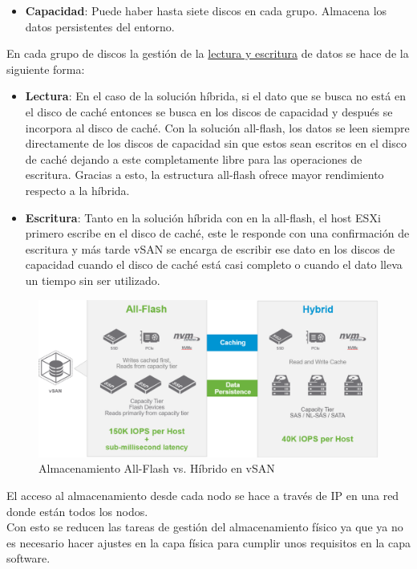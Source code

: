 \begin{itemize}
\begin{itemize}
            \item \textbf{Capacidad}: Puede haber hasta siete discos en cada grupo. Almacena los datos persistentes del entorno.
        \end{itemize}
    En cada grupo de discos la gestión de la \underline{lectura y escritura} de datos se hace de la siguiente forma:
        \begin{itemize}
            \item \textbf{Lectura}: En el caso de la solución híbrida, si el dato que se busca no está en el disco de caché entonces se busca en los discos de capacidad y después se incorpora al disco de caché. Con la solución all-flash, los datos se leen siempre directamente de los discos de capacidad sin que estos sean escritos en el disco de caché dejando a este completamente libre para las operaciones de escritura. Gracias a esto, la estructura all-flash ofrece mayor rendimiento respecto a la híbrida.
            \item \textbf{Escritura}: Tanto en la solución híbrida con en la all-flash, el host ESXi primero escribe en el disco de caché, este le responde con una confirmación de escritura y más tarde vSAN se encarga de escribir ese dato en los discos de capacidad cuando el disco de caché está casi completo o cuando el dato lleva un tiempo sin ser utilizado.
        \end{itemize}
        \begin{figure}[h!]
            \centering
            \includegraphics[width=1\textwidth]{imaxes/cap2recursos/rendimientoVSAN.png}
            \caption{Almacenamiento All-Flash vs. Híbrido en vSAN}
            \label{fig:rendimientoVSAN}
        \end{figure}
        \FloatBarrier
    El acceso al almacenamiento desde cada nodo se hace a través de IP en una red donde están todos los nodos. \\ 
    Con esto se reducen las tareas de gestión del almacenamiento físico ya que ya no es necesario hacer ajustes en la capa física para cumplir unos requisitos en la capa software.

\end{itemize}
